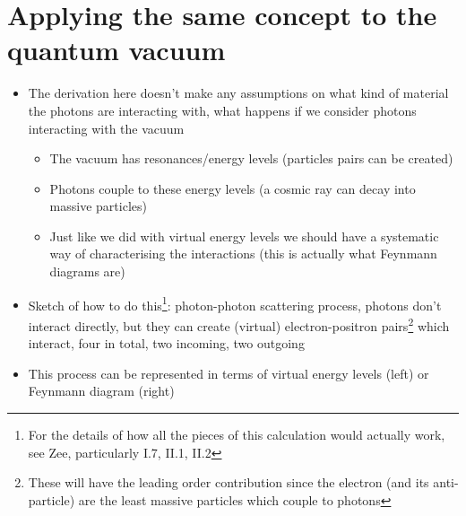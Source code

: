 \documentclass[english]{article}
\begin{document}
\section{Applying the same concept to the quantum vacuum}
\begin{itemize}
\item The derivation here doesn't make any assumptions on what kind of material the photons are interacting with, what happens if we consider photons interacting with the vacuum
\begin{itemize}
\item The vacuum has resonances/energy levels (particles pairs can be created)
\item Photons couple to these energy levels (a cosmic ray can decay into massive particles)
\item Just like we did with virtual energy levels we should have a systematic way of characterising the interactions (this is actually what Feynmann diagrams are)
\end{itemize}
\item Sketch of how to do this\footnote{For the details of how all the pieces of this calculation would actually work, see Zee, particularly I.7, II.1, II.2}: photon-photon scattering process, photons don't interact directly, but they can create (virtual) electron-positron pairs\footnote{These will have the leading order contribution since the electron (and its anti-particle) are the least massive particles which couple to photons} which interact, four in total, two incoming, two outgoing
\item This process can be represented in terms of virtual energy levels (left) or Feynmann diagram (right)


\end{itemize}
\end{document}

